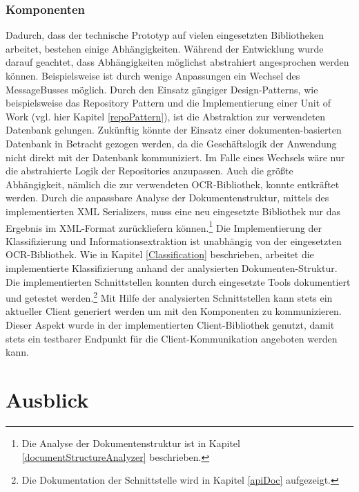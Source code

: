 \subsubsection{Komponenten}
Dadurch, dass der technische Prototyp auf vielen eingesetzten Bibliotheken arbeitet, bestehen einige Abhängigkeiten. Während der Entwicklung wurde darauf geachtet, dass Abhängigkeiten möglichst abstrahiert angesprochen werden können. Beispielsweise ist durch wenige Anpassungen ein Wechsel des MessageBusses möglich. Durch den Einsatz gängiger Design-Patterns, wie beispielsweise das Repository Pattern und die Implementierung einer Unit of Work (vgl. hier Kapitel \ref{repoPattern}), ist die Abstraktion zur verwendeten Datenbank gelungen. Zukünftig könnte der Einsatz einer dokumenten-basierten Datenbank in Betracht gezogen werden, da die Geschäftslogik der Anwendung nicht direkt mit der Datenbank kommuniziert. Im Falle eines Wechsels wäre nur die abstrahierte Logik der Repositories anzupassen. Auch die größte Abhängigkeit, nämlich die zur verwendeten \ac{OCR}-Bibliothek, konnte entkräftet werden. Durch die anpassbare Analyse der Dokumentenstruktur, mittels des implementierten \ac{XML} Serializers, muss eine neu eingesetzte Bibliothek nur das Ergebnis im \ac{XML}-Format zurückliefern können.\footnote{{} Die Analyse der Dokumentenstruktur ist in Kapitel \ref{documentStructureAnalyzer} beschrieben.} Die Implementierung der Klassifizierung und Informationsextraktion ist unabhängig von der eingesetzten \ac{OCR}-Bibliothek. Wie in Kapitel \ref{Classification} beschrieben, arbeitet die implementierte Klassifizierung anhand der analysierten Dokumenten-Struktur.\\
Die implementierten Schnittstellen konnten durch eingesetzte Tools dokumentiert und getestet werden.\footnote{{} Die Dokumentation der Schnittstelle wird in Kapitel \ref{apiDoc} aufgezeigt.} Mit Hilfe der analysierten Schnittstellen kann stets ein aktueller Client generiert werden um mit den Komponenten zu kommunizieren. Dieser Aspekt wurde in der implementierten Client-Bibliothek genutzt, damit stets ein testbarer Endpunkt für die Client-Kommunikation angeboten werden kann.\\

\section{Ausblick}

